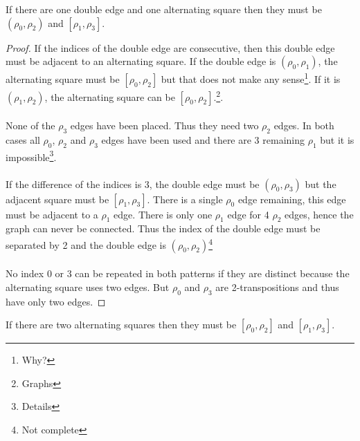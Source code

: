 \begin{lemma}
  If there are one double edge and one alternating square then they must be $(\rho_0, \rho_2)$ and $[\rho_1, \rho_3]$.
\end{lemma}

\begin{proof}
  If the indices of the double edge are consecutive, then this double edge must be adjacent to an alternating square. If the double edge is $(\rho_0, \rho_1)$, the alternating square must be $[\rho_0, \rho_2]$ but that does not make any sense\footnote{Why?}. If it is $(\rho_1, \rho_2)$, the alternating square can be $[\rho_0, \rho_2]$.\footnote{Graphs}.

  \paragraph{}
  None of the $\rho_3$ edges have been placed. Thus they need two $\rho_2$ edges. In both cases all $\rho_0$, $\rho_2$ and $\rho_3$ edges have been used and there are 3 remaining $\rho_1$ but it is impossible\footnote{Details}.

  \paragraph{}
  If the difference of the indices is 3, the double edge must be $(\rho_0, \rho_3)$ but the adjacent square must be $[\rho_1, \rho_3]$. There is a single $\rho_0$ edge remaining, this edge must be adjacent to a $\rho_1$ edge. There is only one $\rho_1$ edge for 4 $\rho_2$ edges, hence the graph can never be connected. Thus the index of the double edge must be separated by 2 and the double edge is $(\rho_0, \rho_2)$\footnote{Not complete}

  \paragraph{}
  No index 0 or 3 can be repeated in both patterns if they are distinct because the alternating square uses two edges. But $\rho_0$ and $\rho_3$ are 2-transpositions and thus have only two edges.

\end{proof}

\begin{lemma}
  If there are two alternating squares then they must be $[\rho_0, \rho_2]$ and $[\rho_1, \rho_3]$.
\end{lemma}

